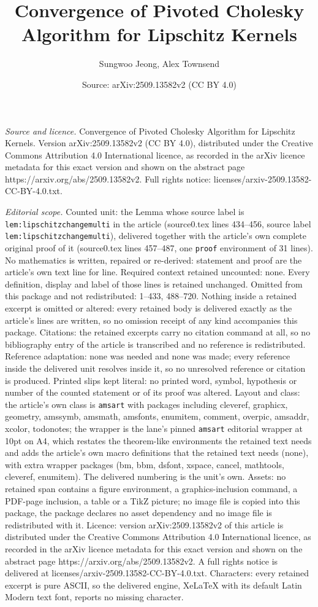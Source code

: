 \documentclass[10pt,a4paper]{amsart}
\title[Convergence of Pivoted Cholesky Algorithm for Lipschitz Kern]{Convergence of Pivoted Cholesky Algorithm for Lipschitz Kernels}
\author{Sungwoo Jeong, Alex Townsend}
\date{Source: arXiv:2509.13582v2 (CC BY 4.0)}
\begin{document}
\maketitle

\noindent\emph{Source and licence.} Convergence of Pivoted Cholesky Algorithm for Lipschitz Kernels. Version arXiv:2509.13582v2 (CC BY 4.0), distributed under the Creative Commons Attribution 4.0 International licence, as recorded in the arXiv licence metadata for this exact version and shown on the abstract page https://arxiv.org/abs/2509.13582v2. Full rights notice: licenses/arxiv-2509.13582-CC-BY-4.0.txt.\par\smallskip

\noindent\textit{Editorial scope.} Counted unit: the Lemma whose source label is \texttt{lem:lipschitzchangemulti} in the article (source0.tex lines 434--456, source label \texttt{lem:lipschitzchangemulti}), delivered together with the article's own complete original proof of it (source0.tex lines 457--487, one \texttt{proof} environment of 31 lines). No mathematics is written, repaired or re-derived: statement and proof are the article's own text line for line. Required context retained uncounted: none. Every definition, display and label of those lines is retained unchanged. Omitted from this package and not redistributed: 1--433, 488--720. Nothing inside a retained excerpt is omitted or altered: every retained body is delivered exactly as the article's lines are written, so no omission receipt of any kind accompanies this package. Citations: the retained excerpts carry no citation command at all, so no bibliography entry of the article is transcribed and no reference is redistributed. Reference adaptation: none was needed and none was made; every reference inside the delivered unit resolves inside it, so no unresolved reference or citation is produced. Printed slips kept literal: no printed word, symbol, hypothesis or number of the counted statement or of its proof was altered. Layout and class: the article's own class is \texttt{amsart} with packages including cleveref, graphicx, geometry, amssymb, amsmath, amsfonts, enumitem, comment, overpic, amsaddr, xcolor, todonotes; the wrapper is the lane's pinned \texttt{amsart} editorial wrapper at 10pt on A4, which restates the theorem-like environments the retained text needs and adds the article's own macro definitions that the retained text needs (none), with extra wrapper packages (bm, bbm, dsfont, xspace, cancel, mathtools, cleveref, enumitem). The delivered numbering is the unit's own. Assets: no retained span contains a figure environment, a graphics-inclusion command, a PDF-page inclusion, a table or a TikZ picture; no image file is copied into this package, the package declares no asset dependency and no image file is redistributed with it. Licence: version arXiv:2509.13582v2 of this article is distributed under the Creative Commons Attribution 4.0 International licence, as recorded in the arXiv licence metadata for this exact version and shown on the abstract page https://arxiv.org/abs/2509.13582v2. A full rights notice is delivered at licenses/arxiv-2509.13582-CC-BY-4.0.txt. Characters: every retained excerpt is pure ASCII, so the delivered engine, XeLaTeX with its default Latin Modern text font, reports no missing character.
\end{document}
